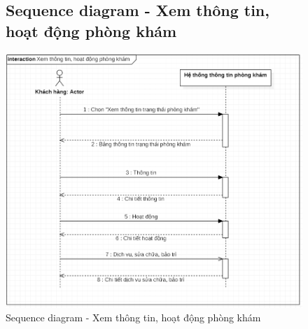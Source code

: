 \documentclass{report}
\begin{document}
\begin{center}
	\begin{figure}[!htp]
		\subsection{Sequence diagram - Xem thông tin, hoạt động phòng khám}
		\begin{center}
			\includegraphics[scale=.35]{Hinh/Sequence diagram Xem thông tin, hoạt động phòng khám.png}
		\end{center}
		\caption{Sequence diagram - Xem thông tin, hoạt động phòng khám}
	\end{figure}
\end{center}
\end{document}
